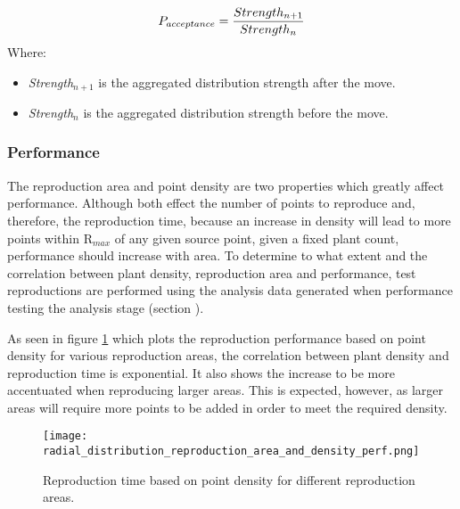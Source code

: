 \begin{equation}
\centering
P_{acceptance} = \frac{Strength_{n+1}}{Strength_{n}}
\label{eq:reproduction_probability_acceptance}
\end{equation}
Where:
\begin{itemize}
\item \textit{Strength$_{n+1}$} is the aggregated distribution strength after the move.
\item \textit{Strength$_{n}$} is the aggregated distribution strength before the move.
\end{itemize}

\subsubsection{Performance}

The reproduction area and point density are two properties which greatly affect performance. Although both effect the number of points to reproduce and, therefore, the reproduction time, because an increase in density will lead to more points within R$_{max}$ of any given source point, given a fixed plant count, performance should increase with area. To determine to what extent and the correlation between plant density, reproduction area and performance, test reproductions are performed using the analysis data generated when performance testing the analysis stage (section \label{subsubsec:analysis_performance}).

As seen in figure \ref{fig:reproduction_density_area_perf} which plots the reproduction performance based on point density for various reproduction areas, the correlation between plant density and reproduction time is exponential. It also shows the increase to be more accentuated when reproducing larger areas. This is expected, however, as larger areas will require more points to be added in order to meet the required density.\\

\begin{figure}
\center
	\texttt{[image: radial\_distribution\_reproduction\_area\_and\_density\_perf.png]}
	\caption{ Reproduction time based on point density for different reproduction areas.}	
	\label{fig:reproduction_density_area_perf}
\end{figure}

